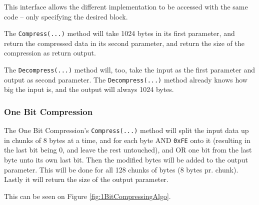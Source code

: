 This interface allows the different implementation to be accessed with the same code -- only specifying the desired block.

The \texttt{Compress(...)} method will take 1024 bytes in its first parameter, and return the compressed data in its second parameter, and return the size of the compression as return output.

The \texttt{Decompress(...)} method will, too, take the input as the first parameter and output as second parameter. 
The \texttt{Decompress(...)} method already knows how big the input is, and the output will always 1024 bytes.

\subsubsection{One Bit Compression}
The One Bit Compression's \texttt{Compress(...)} method will split the input data up in chunks of 8 bytes at a time, and for each byte AND \texttt{0xFE} onto it (resulting in the last bit being 0, and leave the rest untouched), and OR one bit from the last byte unto its own last bit.
Then the modified bytes will be added to the output parameter.
This will be done for all 128 chunks of bytes (8 bytes pr. chunk).
Lastly it will return the size of the output parameter.

This can be seen on Figure \ref{fig:1BitCompressingAlgo}.

